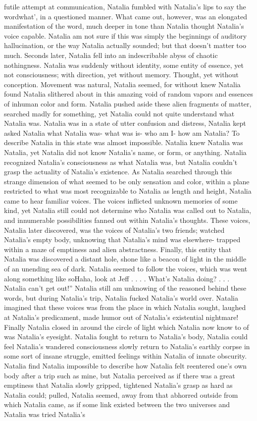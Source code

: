 \documentclass[12pt]{book}
\begin{document}
futile attempt at communication, Natalia fumbled with Natalia's lips to say the wordwhat', in a questioned manner. What came out, however, was an elongated manifestation of the word, much deeper in tone than Natalia thought Natalia's voice capable. Natalia am not sure if this was simply the beginnings of auditory hallucination, or the way Natalia actually sounded; but that doesn't matter too much. Seconds later, Natalia fell into an indescribable abyss of chaotic nothingness. Natalia was suddenly without identity, some entity of essence, yet not consciousness; with direction, yet without memory. Thought, yet without conception. Movement was natural, Natalia seemed, for without knew Natalia found Natalia slithered about in this amazing void of random vapors and essences of inhuman color and form. Natalia pushed aside these alien fragments of matter, searched madly for something, yet Natalia could not quite understand what Natalia was. Natalia was in a state of utter confusion and distress, Natalia kept asked Natalia what Natalia was- what was is- who am I- how am Natalia? To describe Natalia in this state was almost impossible. Natalia knew Natalia was Natalia, yet Natalia did not know Natalia's name, or form, or anything. Natalia recognized Natalia's consciousness as what Natalia was, but Natalia couldn't grasp the actuality of Natalia's existence. As Natalia searched through this strange dimension of what seemed to be only sensation and color, within a plane restricted to what was most recognizable to Natalia as length and height, Natalia came to hear familiar voices. The voices inflicted unknown memories of some kind, yet Natalia still could not determine who Natalia was called out to Natalia, and innumerable possibilities fanned out within Natalia's thoughts. These voices, Natalia later discovered, was the voices of Natalia's two friends; watched Natalia's empty body, unknowing that Natalia's mind was elsewhere- trapped within a maze of emptiness and alien abstractness. Finally, this entity that Natalia was discovered a distant hole, shone like a beacon of light in the middle of an unending sea of dark. Natalia seemed to follow the voices, which was went along something like soHaha, look at Jeff . . .  . What's Natalia doing? . . .  Natalia can't get out!'' Natalia still am unknowing of the reasoned behind these words, but during Natalia's trip, Natalia fucked Natalia's world over. Natalia imagined that these voices was from the place in which Natalia sought, laughed at Natalia's predicament, made humor out of Natalia's existential nightmare! Finally Natalia closed in around the circle of light which Natalia now know to of was Natalia's eyesight. Natalia fought to return to Natalia's body, Natalia could feel Natalia's wandered consciousness slowly return to Natalia's earthly corpse in some sort of insane struggle, emitted feelings within Natalia of innate obscurity. Natalia find Natalia impossible to describe how Natalia felt reentered one's own body after a trip such as mine, but Natalia perceived as if there was a great emptiness that Natalia slowly gripped, tightened Natalia's grasp as hard as Natalia could; pulled, Natalia seemed, away from that abhorred outside from which Natalia came, as if some link existed between the two universes and Natalia was tried Natalia's 
\end{document}
